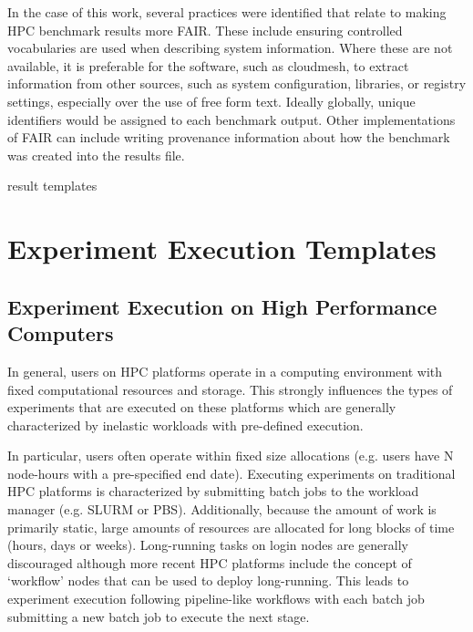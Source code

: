 \documentclass[utf8]{FrontiersinVancouver} %
\begin{document}
In the case of this work, several practices were identified that relate to making HPC benchmark results more FAIR\citep{kirkpatrick2024}. These include ensuring controlled vocabularies are used when describing system information. Where these are not available, it is preferable for the software, such as cloudmesh, to extract information from other sources, such as system configuration, libraries, or registry settings, especially over the use of free form text. Ideally globally, unique identifiers would be assigned to each benchmark output. Other implementations of FAIR can include writing provenance information about how the benchmark was created into the results file.

result templates


\section{Experiment Execution Templates}

\subsection{Experiment Execution on High Performance Computers}

In general, users on HPC platforms operate in a computing environment with fixed computational resources and storage. This strongly influences the types of experiments that are executed on these platforms which are generally characterized by inelastic workloads with pre-defined execution.

In particular, users often operate within fixed size allocations (e.g. users have N node-hours with a pre-specified end date). Executing experiments on traditional HPC platforms is characterized by submitting batch jobs to the workload manager (e.g. SLURM or PBS). Additionally, because the amount of work is primarily static, large amounts of resources are allocated for long blocks of time (hours, days or weeks). Long-running tasks on login nodes are generally discouraged although more recent HPC platforms include the concept of `workflow' nodes that can be used to deploy long-running. This leads to experiment execution following pipeline-like workflows with each batch job submitting a new batch job to execute the next stage.
\end{document}

